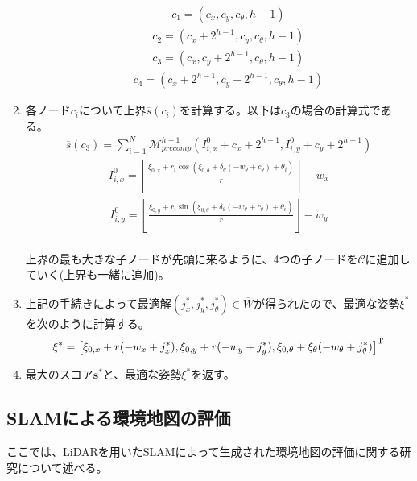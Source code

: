 \begin{enumerate}
\begin{enumerate}
    \begin{align*}
      c_1 = (c_x,c_y,c_{\theta},h-1)
    \end{align*}
    \begin{align*}
      c_2 = (c_x+2^{h-1},c_y,c_{\theta},h-1)
    \end{align*}
    \begin{align*}
      c_3 = (c_x,c_y+2^{h-1},c_{\theta},h-1)
    \end{align*}
    \begin{align*}
      c_4 = (c_x+2^{h-1},c_y+2^{h-1},c_{\theta},h-1)
    \end{align*}
  \end{enumerate}
  \item 各ノード$c_i$について上界$\overline{s}(c_i)$を計算する。以下は$c_3$の場合の計算式である。
  \begin{align*}
    \overline{s}(c_3) = \sum_{i=1}^{N}\mathcal{M}_{precomp}^{h-1}(I_{i,x}^{0}+c_x+2^{h-1},I_{i,y}^{0}+c_y+2^{h-1})  
  \end{align*}
  \begin{align*}
    I_{i,x}^0 = \left\lfloor \frac{\xi_{0,x}+r_i\cos(\xi_{0,\theta}+\delta_{\theta}(-w_{\theta}+c_{\theta})+\theta_i)}{r}\right\rfloor -w_x
  \end{align*}
  \begin{align*}
    I_{i,y}^0 = \left\lfloor \frac{\xi_{0,y}+r_i\sin(\xi_{0,\theta}+\delta_{\theta}(-w_{\theta}+c_{\theta})+\theta_i)}{r}\right\rfloor -w_y
  \end{align*}
  \\
  上界の最も大きな子ノードが先頭に来るように、4つの子ノードを$\mathcal{C}$に追加していく(上界も一緒に追加)。
  \item 上記の手続きによって最適解$(j_x^{*},j_y^{*},j_{\theta}^{*})\in\overline{W}$が得られたので、最適な姿勢$\xi^{*}$を次のように計算する。\\
  \begin{align*}
    \xi^{*} = \bigl[\xi_{0,x}+r(-w_x+j_x^{*}),\xi_{0,y}+r(-w_y+j_y^{*}),\xi_{0,\theta}+\xi_{\theta}(-w_{\theta}+j_{\theta}^{*})\bigr]^{\rm{T}}
  \end{align*}
  \item 最大のスコア$\bm{s}^{*}$と、最適な姿勢$\xi^{*}$を返す。
\end{enumerate}

\subsection{SLAMによる環境地図の評価}
ここでは、LiDARを用いたSLAMによって生成された環境地図の評価に関する研究について述べる。

